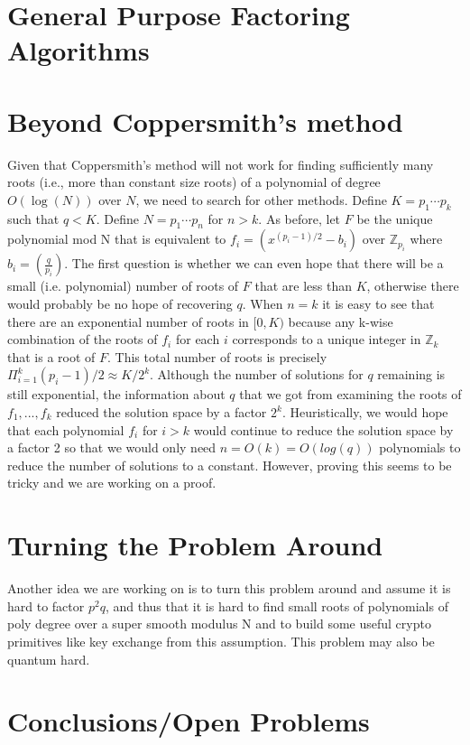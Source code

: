 \documentclass[letterpaper,twocolumn,10pt]{article}
\begin{document}
\section{General Purpose Factoring Algorithms}



\section{Beyond Coppersmith's method} 
Given that Coppersmith's method will not work for finding sufficiently many roots (i.e., more than constant size roots) of a polynomial of degree $O(\log(N))$ over $N$, we need to search for other methods. Define $K = p_1 \cdots p_k$ such that $q < K$. Define $N = p_1 \cdots p_n$ for $n > k$. As before, let $F$ be the unique polynomial mod N that is equivalent to $f_i = (x^{(p_i - 1)/2} - b_i)$ over $\mathbb{Z}_{p_i}$ where $b_i =  \left(\frac{q}{p_i}\right)$. The first question is whether we can even hope that there will be a small (i.e. polynomial) number of roots of $F$ that are less than $K$, otherwise there would probably be no hope of recovering $q$. When $n = k$ it is easy to see that there are an exponential number of roots in $[0, K)$ because any k-wise combination of the roots of $f_i$ for each $i$ corresponds to a unique integer in $\mathbb{Z}_k$ that is a root of $F$. This total number of roots is precisely $\Pi_{i= 1}^k (p_i - 1)/2 \approx K/2^k$. Although the number of solutions for $q$ remaining is still exponential, the information about $q$ that we got from examining the roots of $f_1,...,f_k$ reduced the solution space by a factor $2^k$. Heuristically, we would hope that each polynomial $f_i$ for $i > k$ would continue to reduce the solution space by a factor 2 so that we would only need $n = O(k) = O(log(q))$ polynomials to reduce the number of solutions to a constant. However, proving this seems to be tricky and we are working on a proof. 

\section{Turning the Problem Around} 
Another idea we are working on is to turn this problem around and assume it is hard to factor $p^2q$, and thus that it is hard to find small roots of polynomials of poly degree over a super smooth modulus N and to build some useful crypto primitives like key exchange from this assumption. This problem may also be quantum hard. 

\section{Conclusions/Open Problems}
\end{document}
